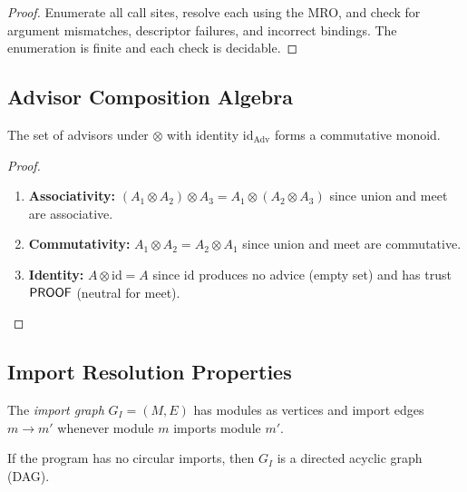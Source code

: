 \documentclass[11pt]{article}
\newcommand{\AdvCompose}{\otimes}
\begin{document}
\begin{proof}
Enumerate all call sites, resolve each using the MRO, and check
for argument mismatches, descriptor failures, and incorrect
bindings.  The enumeration is finite and each check is decidable.
\end{proof}

\subsection{Advisor Composition Algebra}
\label{app:algebra}

\begin{lemma}
\label{lem:adv-monoid}
The set of advisors under $\AdvCompose$ with identity
$\mathrm{id}_{\mathrm{Adv}}$ forms a commutative monoid.
\end{lemma}

\begin{proof}
\begin{enumerate}
\item \textbf{Associativity:} $(A_1 \AdvCompose A_2) \AdvCompose A_3
  = A_1 \AdvCompose (A_2 \AdvCompose A_3)$ since union and meet
  are associative.
\item \textbf{Commutativity:} $A_1 \AdvCompose A_2 = A_2 \AdvCompose A_1$
  since union and meet are commutative.
\item \textbf{Identity:} $A \AdvCompose \mathrm{id} = A$ since
  $\mathrm{id}$ produces no advice (empty set) and has trust
  $\mathsf{PROOF}$ (neutral for meet).
\end{enumerate}
\end{proof}

\subsection{Import Resolution Properties}
\label{app:import-props}

\begin{definition}
\label{def:import-graph}
The \emph{import graph} $G_I = (M, E)$ has modules as vertices
and import edges $m \to m'$ whenever module $m$ imports module $m'$.
\end{definition}

\begin{lemma}
\label{lem:import-dag}
If the program has no circular imports, then $G_I$ is a directed
acyclic graph (DAG).
\end{lemma}
\end{document}
